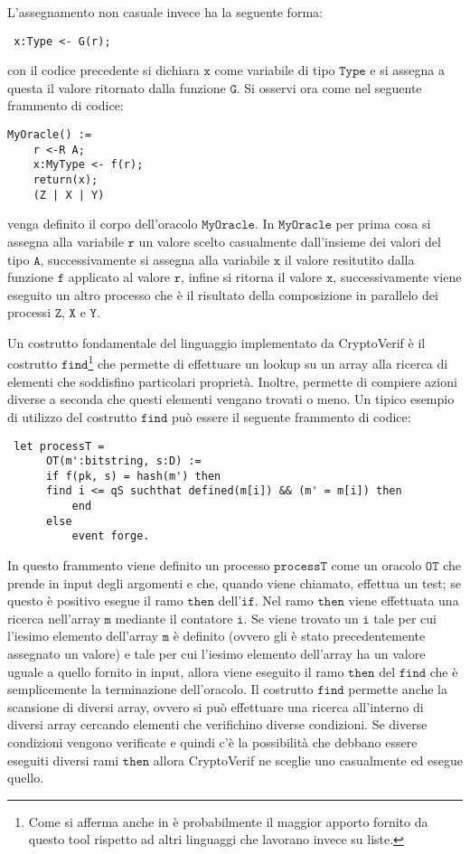\documentclass[a4paper,openright,twoside,12pt]{report}
\begin{document}
L'assegnamento non casuale invece ha la seguente forma:
\begin{verbatim}
 x:Type <- G(r);
\end{verbatim}
con il codice precedente si dichiara $\texttt{x}$ come variabile di tipo $\texttt{Type}$ e si assegna a questa il valore ritornato dalla funzione $\texttt{G}$. 
Si osservi ora come nel seguente frammento di codice:
\begin{verbatim}
MyOracle() :=
    r <-R A;
    x:MyType <- f(r);
    return(x);
    (Z | X | Y)
\end{verbatim}
venga definito il corpo dell'oracolo $\texttt{MyOracle}$. In $\texttt{MyOracle}$ per prima cosa si assegna alla variabile $\texttt{r}$ un valore scelto casualmente dall'insieme dei valori del tipo $\texttt{A}$,
successivamente si assegna alla variabile $\texttt{x}$ il valore resitutito dalla funzione $\texttt{f}$ applicato al valore $\texttt{r}$, infine si ritorna il valore $\texttt{x}$, successivamente viene eseguito un altro processo
che \`e il risultato della composizione in parallelo dei processi $\texttt{Z}$, $\texttt{X}$ e $\texttt{Y}$. 


Un costrutto fondamentale del linguaggio implementato da CryptoVerif \`e il costrutto $\texttt{find}$\footnote{Come si afferma anche in \cite{BlanchetPointchevalCrypto06} \`e probabilmente il maggior apporto 
fornito da questo tool rispetto ad altri linguaggi che lavorano invece su liste.} 
che permette di effettuare un lookup su un array alla ricerca di elementi che soddisfino particolari propriet\`a. Inoltre, permette di compiere azioni diverse a seconda che 
questi elementi vengano trovati o meno. Un tipico esempio di utilizzo del costrutto $\texttt{find}$ pu\`o essere il seguente frammento di codice:
\begin{verbatim}
 let processT =
      OT(m':bitstring, s:D) :=
      if f(pk, s) = hash(m') then
      find i <= qS suchthat defined(m[i]) && (m' = m[i]) then 
          end 
      else
          event forge.
\end{verbatim}
In questo frammento viene definito un processo $\texttt{processT}$ come un oracolo $\texttt{OT}$ che prende in input degli argomenti e che, quando viene chiamato, effettua un test; se questo \`e positivo esegue il ramo
$\texttt{then}$ dell'$\texttt{if}$. Nel ramo $\texttt{then}$ viene effettuata una ricerca nell'array $\texttt{m}$ mediante il contatore $\texttt{i}$. Se viene trovato un $\texttt{i}$ tale per cui l'iesimo elemento dell'array $\texttt{m}$ \`e definito (ovvero gli \`e stato
precedentemente assegnato un valore) e tale per cui l'iesimo elemento dell'array ha un valore uguale a quello fornito in input, allora viene eseguito il ramo $\texttt{then}$ del $\texttt{find}$ che \`e semplicemente
la terminazione dell'oracolo.
Il costrutto $\texttt{find}$ permette anche la scansione di diversi array, ovvero si pu\`o effettuare una ricerca all'interno di diversi array cercando elementi che verifichino diverse condizioni.
Se diverse condizioni vengono verificate e quindi c'\`e la possibilit\`a che debbano essere eseguiti diversi rami $\texttt{then}$ allora CryptoVerif 
ne sceglie uno casualmente ed esegue quello.
\end{document}
